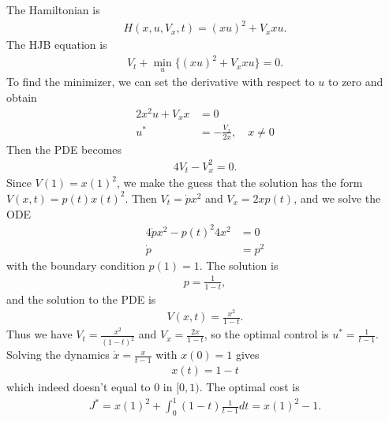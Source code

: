 \documentclass[12pt]{article}
\begin{document}
\begin{problem}[6]
The Hamiltonian is
\begin{align*}
	H(x,u,V_x,t) = (xu)^2 + V_x xu .
\end{align*}
The HJB equation is
\begin{align*}
	V_t + \min_u \{(xu)^2 + V_x xu\} =0.
\end{align*}
To find the minimizer, we can set the derivative with respect to $ u$ to zero and obtain
 \begin{align*}
	2x^2 u + V_x x &= 0 \\
	u^* &= - \frac{V_x}{ 2x} ,\quad  x \neq 0
\end{align*}
Then the PDE becomes
\begin{align*}
	4 V_t - V_x^2 =0 . 
\end{align*}
Since $ V(1) = x(1)^2$, we make the guess that the solution has the form $ V(x,t) = p(t) x(t)^2$. Then $ V_t = \dot{p} x^2$ and $ V_x = 2x p(t)$, and we solve the ODE
 \begin{align*}
	4\dot{p}x^2 - p(t)^2 4 x^2 &= 0 \\
	\dot{p} &= p^2 
\end{align*}
with the boundary condition $ p(1) = 1$. The solution is
 \begin{align*}
	p = \frac{1}{1-t} ,
\end{align*}
and the solution to the PDE is
\begin{align*}
	V(x,t) = \frac{x^2}{ 1-t} .
\end{align*}
Thus we have $ V_t = \frac{x^2}{ (1-t)^2}$ and $ V_x = \frac{2x}{ 1-t}$, so the optimal control is $ u^*  = \frac{1}{t-1}$. Solving the dynamics $ \dot{x} = \frac{x}{t-1}$ with $ x(0)=1$ gives
 \begin{align*}
	x(t) = 1-t
\end{align*}
which indeed doesn't equal to 0 in $ [0,1)$. The optimal cost is
 \begin{align*}
	J^*  = x(1)^2 + \int_{ 0}^{ 1} (1-t) \frac{1}{t-1} dt = x(1)^2-1 .
\end{align*}
\end{problem}
\end{document}
